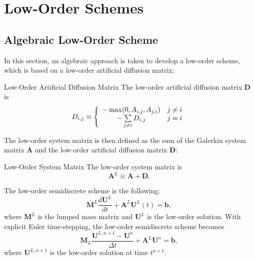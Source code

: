 \section{Low-Order Schemes}
\subsection{Algebraic Low-Order Scheme}\label{algebraicloworder}
In this section, an algebraic approach is taken to develop a low-order scheme,
which is based on a low-order artificial diffusion matrix:
\begin{definition}{Low-Order Artificial Diffusion Matrix}
   The low-order artificial diffusion matrix $\mathbf{D}$ is
   \begin{equation}
      D_{i,j} \equiv \left\{\begin{array}{c c}
         -\max(0,A_{i,j},A_{j,i}) & j\ne i\\
         -\sum\limits_{j\ne i} D_{i,j} & j = i
      \end{array}\right.
   \end{equation}
\end{definition}
The low-order system matrix is then defined as the sum of the Galerkin system
matrix $\mathbf{A}$ and the low-order artificial diffusion matrix $\mathbf{D}$:
\begin{definition}{Low-Order System Matrix}
   The low-order system matrix is
   \begin{equation}\label{systemmatrixdef}
      \mathbf{A}^L \equiv \mathbf{A} + \mathbf{D}.
   \end{equation}
\end{definition}
The low-order semidiscrete scheme is the following:
\begin{equation}\label{semidiscretelow}
   \mathbf{M}^L\frac{d\mathbf{U}^L}{dt}+\mathbf{A}^L \mathbf{U}^L(t) = \mathbf{b},
\end{equation}
where $\mathbf{M}^L$ is the lumped mass matrix and $\mathbf{U}^L$ is the low-order
solution. With explicit Euler time-stepping, the low-order semidiscrete scheme becomes
\begin{equation}\label{loworderexplicit}
   \mathbf{M}_L\frac{\mathbf{U}^{L,n+1}-\mathbf{U}^n}{\Delta t}
      +\mathbf{A}^L\mathbf{U}^n = \mathbf{b},
\end{equation}
where $\mathbf{U}^{L,n+1}$ is the low-order solution at time $t^{n+1}$.
